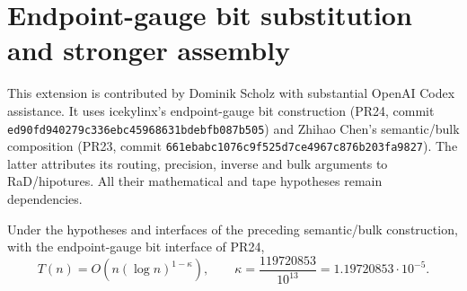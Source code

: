 \section{Endpoint-gauge bit substitution and stronger assembly}
\label{sec:endpoint-semantic-composition}
This extension is contributed by Dominik Scholz with substantial OpenAI
Codex assistance. It uses icekylinx's endpoint-gauge bit construction
(PR24, commit \texttt{ed90fd940279c336ebc45968631bdebfb087b505})
and Zhihao Chen's semantic/bulk composition (PR23, commit
\texttt{661ebabc1076c9f525d7ce4967c876b203fa9827}). The latter attributes
its routing, precision, inverse and bulk arguments to RaD/hipotures.
All their mathematical and tape hypotheses remain dependencies.

\begin{theorem}
Under the hypotheses and interfaces of the preceding semantic/bulk
construction, with the endpoint-gauge bit interface of PR24,
\[
 T(n)=O\!\left(n(\log n)^{1-\kappa}\right),\qquad
 \kappa=\frac{119720853}{10^{13}}=1.19720853\cdot10^{-5}.
\]
\end{theorem}
